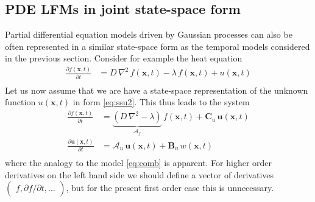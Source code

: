 \documentclass[journal]{IEEEtran}
\begin{document}
\subsection{PDE LFMs in joint state-space form}
%
Partial differential equation models driven by Gaussian processes can also be often represented in a similar state-space form as the temporal models considered in the previous section. Consider for example the heat equation
%
\begin{equation}
\begin{split}
  \frac{\partial f(\mathbf{x},t)}{\partial t} &=
  D \, \nabla^2 \, f(\mathbf{x},t) - \lambda \, f(\mathbf{x},t) + u(\mathbf{x},t) \\
\end{split}
\end{equation}
%
Let us now assume that we are have a state-space representation of the unknown function $u(\mathbf{x},t)$ in form \eqref{eq:ssu2}. This thus leads to the system
%
\begin{equation}
\begin{split}
  \frac{\partial f(\mathbf{x},t)}{\partial t} &=
  \underbrace{\left( D \, \nabla^2 - \lambda \right)}_{\mathbf{\mathcal{A}}_f} \, f(\mathbf{x},t) + \mathbf{C}_u \, \mathbf{u}(\mathbf{x},t) \\
  \frac{\partial\mathbf{u}(\mathbf{x},t)}{\partial t} &= \mathbf{\mathcal{A}}_u \, \mathbf{u}(\mathbf{x},t)
  + \mathbf{B}_u \, w(\mathbf{x},t) \\
\end{split}
\end{equation}
%
where the analogy to the model \eqref{eq:comb} is apparent. For higher order derivatives on the left hand side we should define a vector of derivatives $\begin{pmatrix} f, \partial f/\partial t, \ldots \end{pmatrix}$, but for the present first order case this is unnecessary.
\end{document}
